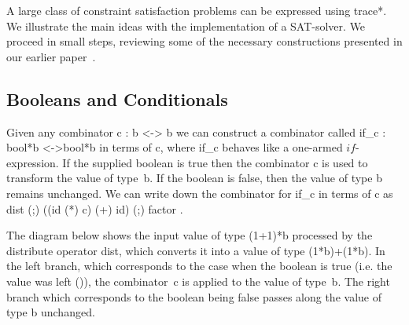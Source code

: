 \documentclass[preprint]{sigplanconf}
\begin{document}
A large class of constraint satisfaction problems can be expressed
using {{trace*}}. We illustrate the main ideas with the implementation
of a SAT-solver.  We proceed in small steps, reviewing some of the
necessary constructions presented in our earlier
paper~\cite{infeffects}.

\subsection{Booleans and Conditionals} 

Given any combinator {{c : b <-> b}} we can construct a combinator called
{{if_c : bool*b <->bool*b}} in terms of {{c}}, where {{if_c}} behaves like a
one-armed $\mathit{if}$-expression. If the supplied boolean is {{true}} then
the combinator {{c}} is used to transform the value of type~{{b}}. If the
boolean is {{false}}, then the value of type {{b}} remains unchanged. We can
write down the combinator for {{if_c}} in terms of {{c}} as 
{{ dist (;) ((id (*) c) (+) id) (;) factor }}.

\noindent The diagram below shows the input value of type {{(1+1)*b}}
processed by the distribute operator {{dist}}, which converts it into a value
of type {{(1*b)+(1*b)}}. In the {{left}} branch, which corresponds to the
case when the boolean is {{true}} (i.e. the value was {{left ()}}), the
combinator~{{c}} is applied to the value of type~{{b}}. The right branch
which corresponds to the boolean being {{false}} passes along the value of
type {{b}} unchanged.

\begin{center}
\end{center}

\end{document}
